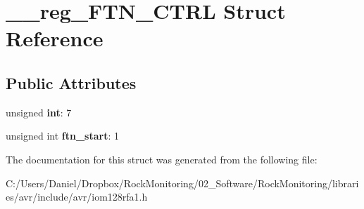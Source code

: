 \hypertarget{struct____reg___f_t_n___c_t_r_l}{}\section{\+\_\+\+\_\+reg\+\_\+\+F\+T\+N\+\_\+\+C\+T\+RL Struct Reference}
\label{struct____reg___f_t_n___c_t_r_l}
\subsection*{Public Attributes}
\begin{DoxyCompactItemize}
\item 
unsigned {\bfseries int}\+: 7\hypertarget{struct____reg___f_t_n___c_t_r_l_a16598fc1b174b5318bd193e238a9c842}{}\label{struct____reg___f_t_n___c_t_r_l_a16598fc1b174b5318bd193e238a9c842}

\item 
unsigned int {\bfseries ftn\+\_\+start}\+: 1\hypertarget{struct____reg___f_t_n___c_t_r_l_a5773b1b07244d7e3ead0afa7237bb52e}{}\label{struct____reg___f_t_n___c_t_r_l_a5773b1b07244d7e3ead0afa7237bb52e}

\end{DoxyCompactItemize}


The documentation for this struct was generated from the following file\+:\begin{DoxyCompactItemize}
\item 
C\+:/\+Users/\+Daniel/\+Dropbox/\+Rock\+Monitoring/02\+\_\+\+Software/\+Rock\+Monitoring/libraries/avr/include/avr/iom128rfa1.\+h\end{DoxyCompactItemize}
